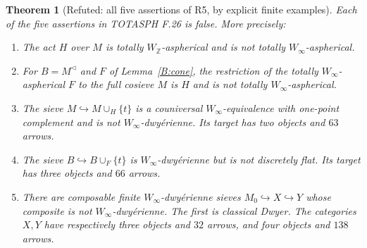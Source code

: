 \documentclass[11pt,a4paper]{article}
\newtheorem{theorem}{Theorem}[section]
\theoremstyle{definition}
\theoremstyle{remark}
\newcommand{\Winfty}{W_\infty}
\newcommand{\WZ}{W_{\mathbb Z}}
\begin{document}
\begin{theorem}[Refuted: all five assertions of R5, by explicit finite examples]\label{B:five}
Each of the five assertions in TOTASPH F.26 is false. More precisely:
\begin{enumerate}[label=(\roman*)]
\item The act $H$ over $M$ is totally $\WZ$-aspherical and is not totally $\Winfty$-aspherical.
\item For $B=M^{\triangleleft}$ and $F$ of Lemma~\ref{B:cone}, the restriction of the totally $\Winfty$-aspherical $F$ to the full cosieve $M$ is $H$ and is not totally $\Winfty$-aspherical.
\item The sieve $M\hookrightarrow M\cup_H\{t\}$ is a couniversal $\Winfty$-equivalence with one-point complement and is not $\Winfty$-dwy\'erienne. Its target has two objects and $63$ arrows.
\item The sieve $B\hookrightarrow B\cup_F\{t\}$ is $\Winfty$-dwy\'erienne but is not discretely flat. Its target has three objects and $66$ arrows.
\item There are composable finite $\Winfty$-dwy\'erienne sieves $M_0\hookrightarrow X\hookrightarrow Y$ whose composite is not $\Winfty$-dwy\'erienne. The first is classical Dwyer. The categories $X,Y$ have respectively three objects and $32$ arrows, and four objects and $138$ arrows.
\end{enumerate}
\end{theorem}
\end{document}
